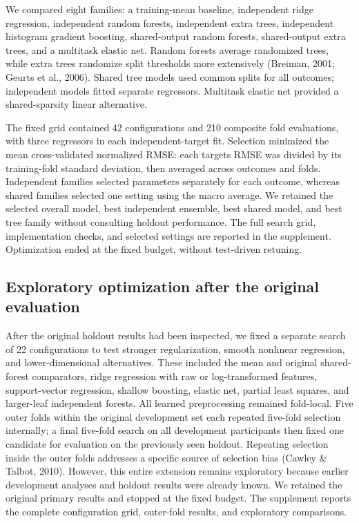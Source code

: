 \documentclass[11pt,letterpaper]{article}
\begin{document}
We compared eight families: a training-mean baseline, independent ridge regression, independent random forests, independent extra trees, independent histogram gradient boosting, shared-output random forests, shared-output extra trees, and a multitask elastic net. Random forests average randomized trees, while extra trees randomize split thresholds more extensively (Breiman, 2001; Geurts et al., 2006). Shared tree models used common splits for all outcomes; independent models fitted separate regressors. Multitask elastic net provided a shared-sparsity linear alternative.

The fixed grid contained 42 configurations and 210 composite fold evaluations, with three regressors in each independent-target fit. Selection minimized the mean cross-validated normalized RMSE: each target\textquotesingle s RMSE was divided by its training-fold standard deviation, then averaged across outcomes and folds. Independent families selected parameters separately for each outcome, whereas shared families selected one setting using the macro average. We retained the selected overall model, best independent ensemble, best shared model, and best tree family without consulting holdout performance. The full search grid, implementation checks, and selected settings are reported in the supplement. Optimization ended at the fixed budget, without test-driven retuning.

\subsection{Exploratory optimization after the original evaluation}\label{exploratory-optimization-after-the-original-evaluation}

After the original holdout results had been inspected, we fixed a separate search of 22 configurations to test stronger regularization, smooth nonlinear regression, and lower-dimensional alternatives. These included the mean and original shared-forest comparators, ridge regression with raw or log-transformed features, support-vector regression, shallow boosting, elastic net, partial least squares, and larger-leaf independent forests. All learned preprocessing remained fold-local. Five outer folds within the original development set each repeated five-fold selection internally; a final five-fold search on all development participants then fixed one candidate for evaluation on the previously seen holdout. Repeating selection inside the outer folds addresses a specific source of selection bias (Cawley \& Talbot, 2010). However, this entire extension remains exploratory because earlier development analyses and holdout results were already known. We retained the original primary results and stopped at the fixed budget. The supplement reports the complete configuration grid, outer-fold results, and exploratory comparisons.
\end{document}
